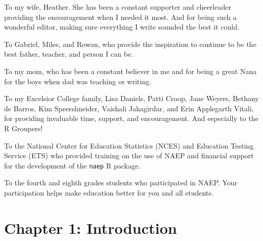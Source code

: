\documentclass[letterpaper,12pt]{article} %
\begin{document}
To my wife, Heather. She has been a constant supporter and cheerleader providing the encouragement when I needed it most.  And for being such a wonderful editor, making sure everything I write sounded the best it could.

To Gabriel, Miles, and Rowan, who provide the inspiration to continue to be the best father, teacher, and person I can be.

To my mom, who has been a constant believer in me and for being a great Nana for the boys when dad was teaching or writing.

To my Excelsior College family, Lisa Daniels, Patti Croop, Jane Weyers, Bethany de Barros, Kim Speershneider, Vaishali Jahagirdar, and Erin Applegarth Vitali, for providing invaluable time, support, and encouragement. And especially to the R Groupers!

To the National Center for Education Statistics (NCES) and Education Testing Service (ETS) who provided training on the use of NAEP and financial support for the development of the \texttt{naep} R package.

To the fourth and eighth grades students who participated in NAEP. Your participation helps make education better for you and all students.

\cleardoublepage

\setcounter{tocdepth}{5}
\tableofcontents
\clearpage
{}  \listoftables
\clearpage
{} \listoffigures


\cleardoublepage
{}
\setcounter{page}{1}
\section{Chapter 1: Introduction}
\end{document}
